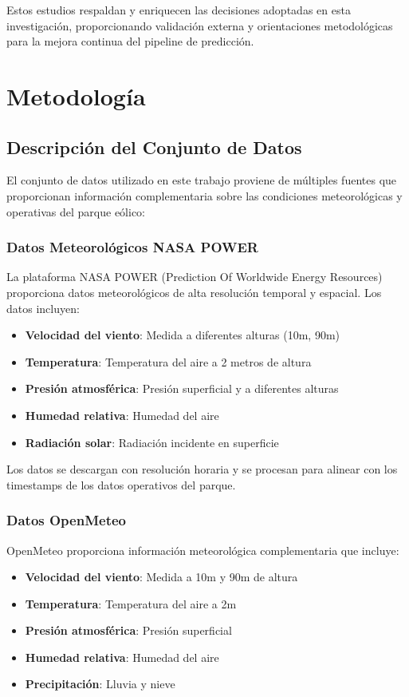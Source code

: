 \documentclass[conference]{IEEEtran}
\begin{document}
	\vspace{0.3cm}
	
	Estos estudios respaldan y enriquecen las decisiones adoptadas en esta investigación, proporcionando validación externa y orientaciones metodológicas para la mejora continua del pipeline de predicción.

	
	\section{Metodología}
	
	\subsection{Descripción del Conjunto de Datos}
	El conjunto de datos utilizado en este trabajo proviene de múltiples fuentes que proporcionan información complementaria sobre las condiciones meteorológicas y operativas del parque eólico:
	
	\subsubsection{Datos Meteorológicos NASA POWER}
	La plataforma NASA POWER (Prediction Of Worldwide Energy Resources) proporciona datos meteorológicos de alta resolución temporal y espacial. Los datos incluyen:
	\begin{itemize}
		\item \textbf{Velocidad del viento}: Medida a diferentes alturas (10m, 90m)
		\item \textbf{Temperatura}: Temperatura del aire a 2 metros de altura
		\item \textbf{Presión atmosférica}: Presión superficial y a diferentes alturas
		\item \textbf{Humedad relativa}: Humedad del aire
		\item \textbf{Radiación solar}: Radiación incidente en superficie
	\end{itemize}
	
	Los datos se descargan con resolución horaria y se procesan para alinear con los timestamps de los datos operativos del parque.
	
	\subsubsection{Datos OpenMeteo}
	OpenMeteo proporciona información meteorológica complementaria que incluye:
	\begin{itemize}
		\item \textbf{Velocidad del viento}: Medida a 10m y 90m de altura
		\item \textbf{Temperatura}: Temperatura del aire a 2m
		\item \textbf{Presión atmosférica}: Presión superficial
		\item \textbf{Humedad relativa}: Humedad del aire
		\item \textbf{Precipitación}: Lluvia y nieve
	\end{itemize}
	
\end{document}
